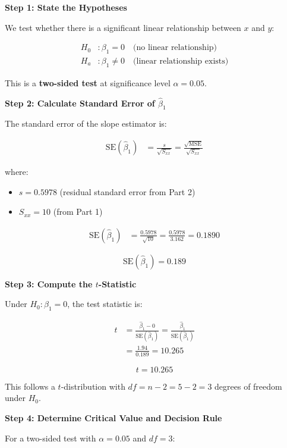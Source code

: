 \documentclass[12pt]{article}
\begin{document}
\begin{solution}
\textbf{Step 1: State the Hypotheses}

We test whether there is a significant linear relationship between $x$ and $y$:

\begin{align*}
H_0 &: \beta_1 = 0 \quad \text{(no linear relationship)} \\
H_a &: \beta_1 \neq 0 \quad \text{(linear relationship exists)}
\end{align*}

This is a \textbf{two-sided test} at significance level $\alpha = 0.05$.

\textbf{Step 2: Calculate Standard Error of $\hat{\beta}_1$}

The standard error of the slope estimator is:

\begin{align*}
\text{SE}(\hat{\beta}_1) &= \frac{s}{\sqrt{S_{xx}}} = \frac{\sqrt{\text{MSE}}}{\sqrt{S_{xx}}}
\end{align*}

where:
\begin{itemize}
    \item $s = 0.5978$ (residual standard error from Part 2)
    \item $S_{xx} = 10$ (from Part 1)
\end{itemize}

\begin{align*}
\text{SE}(\hat{\beta}_1) &= \frac{0.5978}{\sqrt{10}} = \frac{0.5978}{3.162} = 0.1890
\end{align*}

\[
\boxed{\text{SE}(\hat{\beta}_1) = 0.189}
\]

\textbf{Step 3: Compute the $t$-Statistic}

Under $H_0: \beta_1 = 0$, the test statistic is:

\begin{align*}
t &= \frac{\hat{\beta}_1 - 0}{\text{SE}(\hat{\beta}_1)} = \frac{\hat{\beta}_1}{\text{SE}(\hat{\beta}_1)} \\
&= \frac{1.94}{0.189} = 10.265
\end{align*}

\[
\boxed{t = 10.265}
\]

This follows a $t$-distribution with $df = n - 2 = 5 - 2 = 3$ degrees of freedom under $H_0$.

\textbf{Step 4: Determine Critical Value and Decision Rule}

For a two-sided test with $\alpha = 0.05$ and $df = 3$:


\end{solution}
\end{document}
